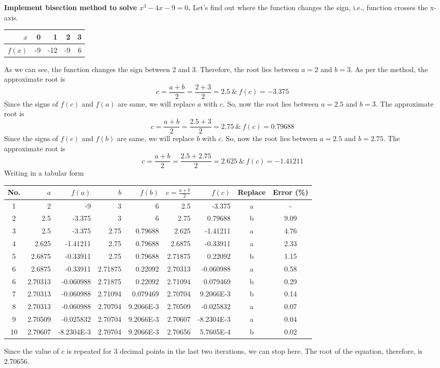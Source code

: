 \documentclass[]{book}
\begin{document}
\begin{ExerciseList}
\Exercise \textbf{Implement bisection method to solve $x^3-4x-9=0$.}
\Answer Let's find out where the function changes the sign, i.e., function crosses the x-axis.
\begin{center}
{\begin{tabular}{|r|r|r|r|r|}
\hline
$x$ & 0 & 1 & 2 & 3\\
\hline
$f(x)$ & -9 & -12 & -9 & 6\\
\hline
\end{tabular}}
\end{center}
As we can see, the function changes the sign between 2 and 3. Therefore, the root lies between $a=2$ and $b=3$. As per the method, the approximate root is 
$$ c = \frac{a+b}{2}=\frac{2+3}{2	}=2.5\ \&\ f(c) = -3.375$$
Since the signs of $f(c)$ and $f(a)$ are same, we will replace $a$ with $c$. So, now the root lies between $a = 2.5$ and $b = 3$. The approximate root is 
$$ c =  \frac{a+b}{2}=\frac{2.5+3}{2}=2.75\ \&\ f(c) = 0.79688$$
Since the signs of $f(c)$ and $f(b)$ are same, we will replace $b$ with $c$. So, now the root lies between $a = 2.5$ and $b = 2.75$. The approximate root is 
$$ c =  \frac{a+b}{2}=\frac{2.5+2.75}{2}=2.625\ \&\ f(c) = -1.41211$$
Writing in a tabular form
\begin{center}
\begin{scriptsize}
\begin{tabular}{|c|r|r|r|r|r|r|c|c|}
\hline
No. & $a$ & $f(a)$ & $b$ & $f(b)$ & $c=\frac{a+b}{2}$ & $f(c)$ & Replace & Error (\%)\\
\hline
1 & 2 & -9 & 3 & 6 & 2.5 & -3.375 & a & -\\
\hline
2 & 2.5 & -3.375 & 3 & 6 & 2.75 & 0.79688 & b & 9.09\\
\hline
3 & 2.5 & -3.375 & 2.75 & 0.79688 & 2.625 & -1.41211 & a & 4.76\\
\hline
4 & 2.625 & -1.41211 & 2.75 & 0.79688 & 2.6875 & -0.33911 & a & 2.33\\
\hline
5 & 2.6875 & -0.33911 & 2.75 & 0.79688 & 2.71875 & 0.22092 & b & 1.15\\
\hline
6 & 2.6875 & -0.33911 & 2.71875 & 0.22092 & 2.70313 & -0.060988 & a & 0.58\\
\hline
6 & 2.70313 & -0.060988 & 2.71875 & 0.22092 & 2.71094 & 0.079469 & b & 0.29\\
\hline
7 & 2.70313 & -0.060988 & 2.71094 & 0.079469 & 2.70704 & 9.2066E-3 & b & 0.14\\
\hline
8 & 2.70313 & -0.060988 & 2.70704 & 9.2066E-3 & 2.70509 & -0.025832 & a & 0.07\\
\hline
9 & 2.70509 & -0.025832 & 2.70704 & 9.2066E-3 & 2.70607 & -8.2304E-3 & a & 0.04\\
\hline
10 & 2.70607 & -8.2304E-3 & 2.70704 & 9.2066E-3 & 2.70656 & 5.7605E-4 & b & 0.02\\
\hline
\end{tabular}
\end{scriptsize}
\end{center}
Since the value of $c$ is repeated for 3 decimal points in the last two iterations, we can stop here. The root of the equation, therefore, is 2.70656.
\end{ExerciseList}



\end{document}
